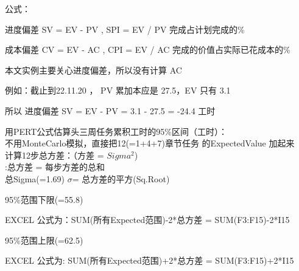 公式：

\begin{description}
\tightlist
\item[]
进度偏差 SV = EV - PV , SPI = EV / PV 完成占计划完成的\%

成本偏差 CV = EV - AC , CPI = EV / AC 完成的价值占实际已花成本的\%
\end{description}

本文实例主要关心进度偏差，所以没有计算 AC

例如：截止到22.11.20 ， PV 累加本应是 27.5，EV 只有 3.1

\begin{description}
\tightlist
\item[]
所以 进度偏差 SV = EV - PV = 3.1 - 27.5 = -24.4 工时
\end{description}

用PERT公式估算头三周任务累积工时的95\%区间（工时）：\\
不用MonteCarlo模拟，直接把12(=1+4+7)章节任务 的ExpectedValue 加起来\\
计算12步总方差：（方差 = \(Sigma^2\))\\
:总方差 = 每步方差的总和\\
总Sigma(=1.69) \(\sigma\)= 总方差的平方(Sq.Root)

\begin{description}
\item[]
\end{description}

\begin{description}
\tightlist
\item[]
95\%范围下限(=55.8)

\begin{description}
\tightlist
\item[]
EXCEL 公式为：SUM(所有Expected范围)-2*总方差  = SUM(F3:F15)-2*I15
\end{description}

95\%范围上限(=62.5)

\begin{description}
\tightlist
\item[]
EXCEL 公式为: SUM(所有Expected范围)+2*总方差  = SUM(F3:F15)+2*I15
\end{description}
\end{description}

